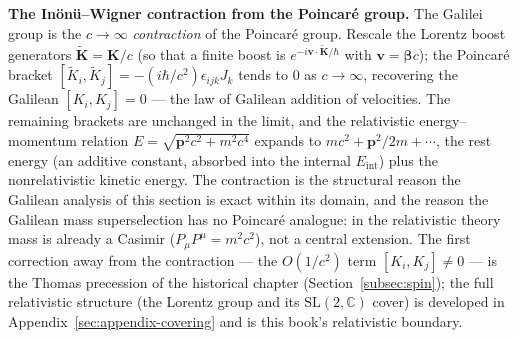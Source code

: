 \medskip\noindent\textbf{The In\"on\"u--Wigner contraction from the Poincar\'e group.} The Galilei group is the $c\to\infty$ \emph{contraction} of the Poincar\'e group. Rescale the Lorentz boost generators $\widetilde{\bm K}=\bm K/c$ (so that a finite boost is $e^{-i\bm v\cdot\widetilde{\bm K}/\hbar}$ with $\bm v=\bm\beta c$); the Poincar\'e bracket $[\widetilde K_{i},\widetilde K_{j}]=-(i\hbar/c^{2})\epsilon_{ijk}J_{k}$ tends to $0$ as $c\to\infty$, recovering the Galilean $[K_{i},K_{j}]=0$ --- the law of Galilean addition of velocities. The remaining brackets are unchanged in the limit, and the relativistic energy--momentum relation $E=\sqrt{\bm p^{2}c^{2}+m^{2}c^{4}}$ expands to $mc^{2}+\bm p^{2}/2m+\cdots$, the rest energy (an additive constant, absorbed into the internal $E_{\mathrm{int}}$) plus the nonrelativistic kinetic energy. The contraction is the structural reason the Galilean analysis of this section is exact within its domain, and the reason the Galilean mass superselection has no Poincar\'e analogue: in the relativistic theory mass is already a Casimir ($P_{\mu}P^{\mu}=m^{2}c^{2}$), not a central extension. The first correction away from the contraction --- the $O(1/c^{2})$ term $[K_{i},K_{j}]\ne0$ --- is the Thomas precession of the historical chapter (Section~\ref{subsec:spin}); the full relativistic structure (the Lorentz group and its $\mathrm{SL}(2,\mathbb C)$ cover) is developed in Appendix~\ref{sec:appendix-covering} and is this book's relativistic boundary.

